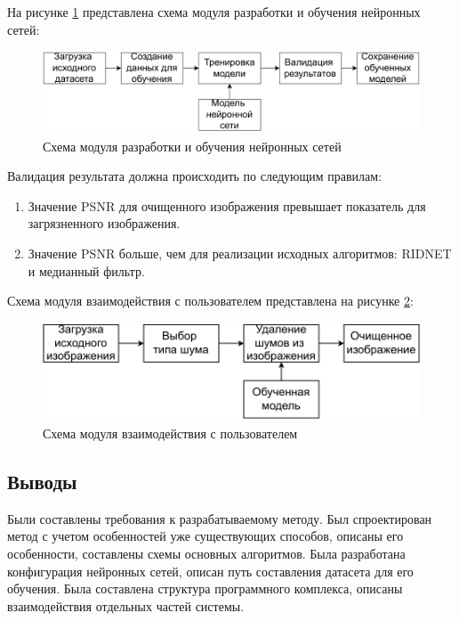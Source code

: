 На рисунке \ref{contruct::module1} представлена схема модуля разработки и обучения нейронных сетей:
\FloatBarrier
\begin{figure}[h]	
	\begin{center}
		\includegraphics[width=\linewidth]{inc/pdf/module1.pdf}
	\end{center}
	\captionsetup{justification=centering}
	\caption{Схема модуля разработки и обучения нейронных сетей}
	\label{contruct::module1}
\end{figure}
\FloatBarrier

Валидация результата должна происходить по следующим правилам:
\begin{enumerate}
	\item Значение PSNR для очищенного изображения превышает показатель для загрязненного изображения.
	\item Значение PSNR больше, чем для реализации исходных алгоритмов: RIDNET и медианный фильтр.
\end{enumerate}

\newpage
Схема модуля взаимодействия с пользователем представлена на рисунке \ref{contruct::module2}:
\FloatBarrier
\begin{figure}[h]	
	\begin{center}
		\includegraphics[width=\linewidth]{inc/pdf/module2.pdf}
	\end{center}
	\captionsetup{justification=centering}
	\caption{Схема модуля взаимодействия с пользователем}
	\label{contruct::module2}
\end{figure}
\FloatBarrier

\subsection*{Выводы}
Были составлены требования к разрабатываемому методу.
Был спроектирован метод с учетом особенностей уже существующих способов, описаны его особенности, составлены схемы основных алгоритмов.
Была разработана конфигурация нейронных сетей, описан путь составления датасета для его обучения.
Была составлена структура программного комплекса, описаны взаимодействия отдельных частей системы.